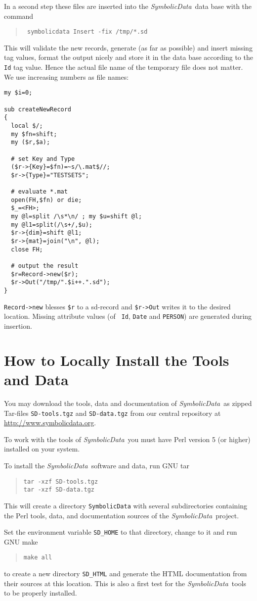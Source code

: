 \documentclass[11pt]{article}
\newcommand{\SD}{{\em Symbo\-lic\-Data}}
\begin{document}
In a second step these files are inserted into the \SD\ data base with
the command
\begin{quote}\tt
symbolicdata Insert -fix /tmp/*.sd
\end{quote}
This will validate the new records, generate (as far as possible) and
insert missing tag values, format the output nicely and store it in
the data base according to the {\tt Id} tag value.  Hence the actual
file name of the temporary file does not matter.  We use increasing
numbers as file names: 
{\small\begin{verbatim} 
my $i=0;

sub createNewRecord
{
  local $/;
  my $fn=shift;
  my ($r,$a); 

  # set Key and Type	
  ($r->{Key}=$fn)=~s/\.mat$//;
  $r->{Type}="TESTSETS";

  # evaluate *.mat
  open(FH,$fn) or die;
  $_=<FH>;
  my @l=split /\s*\n/ ; my $u=shift @l;
  my @l1=split(/\s+/,$u);
  $r->{dim}=shift @l1;
  $r->{mat}=join("\n", @l);
  close FH;

  # output the result
  $r=Record->new($r); 
  $r->Out("/tmp/".$i++.".sd"); 
}
\end{verbatim}}
{\tt Record->new} blesses {\tt \$r} to a sd-record and {\tt \$r->Out}
writes it to the desired location. Missing attribute values (of {\tt
Id}, {\tt Date} and {\tt PERSON}) are generated during insertion.

\section{How to Locally Install the Tools and Data}

You may download the tools, data and documentation of \SD\ as zipped
Tar-files {\tt SD-tools.tgz} and {\tt SD-data.tgz} from our central
repository at \url{http://www.symbolicdata.org}.

To work with the tools of \SD\ you must have Perl version 5 (or
higher) installed on your system.

To install the \SD\ software and data, run GNU tar 
\begin{quote}\tt tar -xzf SD-tools.tgz \\ tar -xzf SD-data.tgz 
\end{quote}

This will create a directory {\tt SymbolicData} with several
subdirectories containing the Perl tools, data, and documentation
sources of the \SD\ project.

Set the environment variable \verb?SD_HOME? to that directory,
change to it and run GNU make
\begin{quote}\tt  make all \end{quote}
to create a new directory {\tt SD\_HTML} and generate the HTML
documentation from their sources at this location. This is also a
first test for the \SD\ tools to be properly installed.
\end{document}
